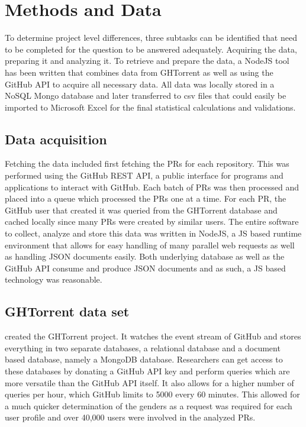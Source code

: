 \section{Methods and Data}

To determine project level differences, three subtasks can be identified that need to be completed for the question to be answered adequately. Acquiring the data, preparing it and analyzing it. To retrieve and prepare the data, a NodeJS tool has been written that combines data from GHTorrent as well as using the GitHub \ac{API} to acquire all necessary data. All data was locally stored in a NoSQL Mongo database and later transferred to \ac{csv} files that could easily be imported to Microsoft Excel for the final statistical calculations and validations.

\subsection{Data acquisition}

Fetching the data included first fetching the \ac{PR}s for each repository. This was performed using the GitHub REST \ac{API}, a public interface for programs and applications to interact with GitHub. Each batch of \ac{PR}s was then processed and placed into a queue which processed the \ac{PR}s one at a time. For each \ac{PR}, the GitHub user that created it was queried from the GHTorrent database and cached locally since many \ac{PR}s were created by similar users. The entire software to collect, analyze and store this data was written in NodeJS, a \ac{JS} based runtime environment that allows for easy handling of many parallel web requests as well as handling \ac{JSON} documents easily. Both underlying database as well as the GitHub \ac{API} consume and produce \ac{JSON} documents and as such, a \ac{JS} based technology was reasonable.

\subsection{GHTorrent data set}

\citeauthor{Gousi13} created the GHTorrent project. It watches the event stream of GitHub and stores everything in two separate databases, a relational database and a document based database, namely a MongoDB database. Researchers can get access to these databases by donating a GitHub \ac{API} key and perform queries which are more versatile than the GitHub \ac{API} itself. It also allows for a higher number of queries per hour, which GitHub limits to 5000 every 60 minutes. This allowed for a much quicker determination of the genders as a request was required for each user profile and over 40,000 users were involved in the analyzed \ac{PR}s.


